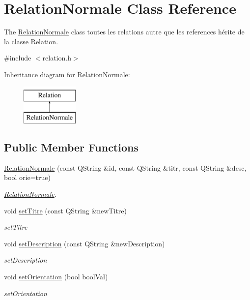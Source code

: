 \hypertarget{class_relation_normale}{}\section{Relation\+Normale Class Reference}
\label{class_relation_normale}


The \hyperlink{class_relation_normale}{Relation\+Normale} class toutes les relations autre que les references hérite de la classe \hyperlink{class_relation}{Relation}.  




{\ttfamily \#include $<$relation.\+h$>$}

Inheritance diagram for Relation\+Normale\+:\begin{figure}[H]
\begin{center}
\leavevmode
\includegraphics[height=2.000000cm]{class_relation_normale}
\end{center}
\end{figure}
\subsection*{Public Member Functions}
\begin{DoxyCompactItemize}
\item 
\hyperlink{class_relation_normale_a5e8fc9d2fc7da6d4d4cd3bb42c91070c}{Relation\+Normale} (const Q\+String \&id, const Q\+String \&titr, const Q\+String \&desc, bool orie=true)
\begin{DoxyCompactList}\small\item\em \hyperlink{class_relation_normale}{Relation\+Normale}. \end{DoxyCompactList}\item 
void \hyperlink{class_relation_normale_abd0076a23f702ced9af181a0f046652c}{set\+Titre} (const Q\+String \&new\+Titre)
\begin{DoxyCompactList}\small\item\em set\+Titre \end{DoxyCompactList}\item 
void \hyperlink{class_relation_normale_a74c586177c06279726df02dd1d8b721a}{set\+Description} (const Q\+String \&new\+Description)
\begin{DoxyCompactList}\small\item\em set\+Description \end{DoxyCompactList}\item 
void \hyperlink{class_relation_normale_a1e660e212501ad0ddb38dc9949735cf2}{set\+Orientation} (bool bool\+Val)
\begin{DoxyCompactList}\small\item\em set\+Orientation \end{DoxyCompactList}\end{DoxyCompactItemize}
